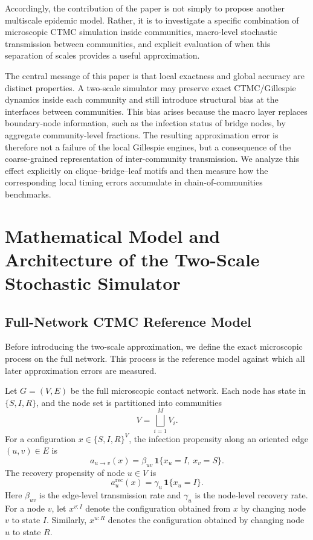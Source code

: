 \documentclass{article}
\begin{document}
Accordingly, the contribution of the paper is not simply to propose another multiscale epidemic model. Rather, it is to investigate a specific combination of microscopic CTMC simulation inside communities, macro-level stochastic transmission between communities, and explicit evaluation of when this separation of scales provides a useful approximation.

The central message of this paper is that local exactness and global accuracy are distinct properties. 
A two-scale simulator may preserve exact CTMC/Gillespie dynamics inside each community and still introduce structural bias at the interfaces between communities. 
This bias arises because the macro layer replaces boundary-node information, such as the infection status of bridge nodes, by aggregate community-level fractions. 
The resulting approximation error is therefore not a failure of the local Gillespie engines, but a consequence of the coarse-grained representation of inter-community transmission. 
We analyze this effect explicitly on clique--bridge--leaf motifs and then measure how the corresponding local timing errors accumulate in chain-of-communities benchmarks.



\section{Mathematical Model and Architecture of the Two-Scale Stochastic Simulator}

\subsection{Full-Network CTMC Reference Model}
\label{sec:full_network_ctmc_reference}

Before introducing the two-scale approximation, we define the exact microscopic process on the full network. This process is the reference model against which all later approximation errors are measured.

Let \(G=(V,E)\) be the full microscopic contact network. Each node has state in \(\{S,I,R\}\), and the node set is partitioned into communities
\[
V=\bigsqcup_{i=1}^{M} V_i .
\]
For a configuration \(x\in\{S,I,R\}^{V}\), the infection propensity along an oriented edge \((u,v)\in E\) is
\[
a_{u\to v}(x)
=\beta_{uv}\,\mathbf{1}\{x_u=I,\ x_v=S\}.
\]
The recovery propensity of node \(u\in V\) is
\[
a_u^{\mathrm{rec}}(x)
=\gamma_u\,\mathbf{1}\{x_u=I\}.
\]
Here \(\beta_{uv}\) is the edge-level transmission rate and \(\gamma_u\) is the node-level recovery rate. For a node \(v\), let \(x^{v:I}\) denote the configuration obtained from \(x\) by changing node \(v\) to state \(I\). Similarly, \(x^{u:R}\) denotes the configuration obtained by changing node \(u\) to state \(R\).
\end{document}
